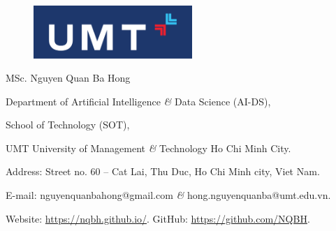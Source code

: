 \documentclass[11pt]{article}
\begin{document}
\begin{figure}[H]
    \includegraphics[width=6cm]{UMT_logo}
\end{figure}

\begin{flushleft}
     MSc. {\sc Nguyen Quan Ba Hong}
     
     Department of Artificial Intelligence {\it\&} Data Science (AI-DS),
     
     School of Technology (SOT),
     
     UMT University of Management {\it\&} Technology Ho Chi Minh City.
     
     Address: Street no. 60 -- Cat Lai, Thu Duc, Ho Chi Minh city, Viet Nam.
     
     E-mail: {\sf nguyenquanbahong@gmail.com} {\it\&} {\sf hong.nguyenquanba@umt.edu.vn}.
     
     Website: \url{https://nqbh.github.io/}. GitHub: \url{https://github.com/NQBH}.
\end{flushleft}
\end{document}
